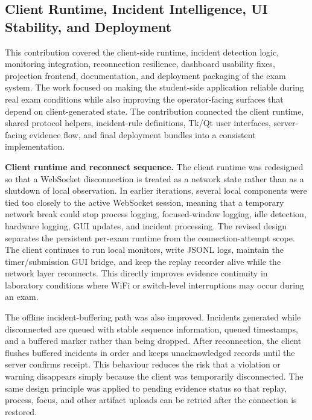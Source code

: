 %
%

\subsection{Client Runtime, Incident Intelligence, UI Stability, and Deployment}
This contribution covered the client-side runtime, incident detection logic, monitoring integration, reconnection resilience, dashboard usability fixes, projection frontend, documentation, and deployment packaging of the exam system. The work focused on making the student-side application reliable during real exam conditions while also improving the operator-facing surfaces that depend on client-generated state. The contribution connected the client runtime, shared protocol helpers, incident-rule definitions, Tk/Qt user interfaces, server-facing evidence flow, and final deployment bundles into a consistent implementation.

\textbf{Client runtime and reconnect sequence.} The client runtime was redesigned so that a WebSocket disconnection is treated as a network state rather than as a shutdown of local observation. In earlier iterations, several local components were tied too closely to the active WebSocket session, meaning that a temporary network break could stop process logging, focused-window logging, idle detection, hardware logging, GUI updates, and incident processing. The revised design separates the persistent per-exam runtime from the connection-attempt scope. The client continues to run local monitors, write JSONL logs, maintain the timer/submission GUI bridge, and keep the replay recorder alive while the network layer reconnects. This directly improves evidence continuity in laboratory conditions where WiFi or switch-level interruptions may occur during an exam.

The offline incident-buffering path was also improved. Incidents generated while disconnected are queued with stable sequence information, queued timestamps, and a buffered marker rather than being dropped. After reconnection, the client flushes buffered incidents in order and keeps unacknowledged records until the server confirms receipt. This behaviour reduces the risk that a violation or warning disappears simply because the client was temporarily disconnected. The same design principle was applied to pending evidence status so that replay, process, focus, and other artifact uploads can be retried after the connection is restored.

